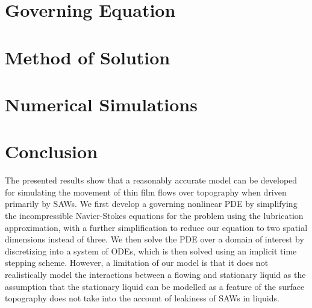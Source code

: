 \documentclass{article}
\begin{document}
\section{Governing Equation} \label{sec:gov_eq}

 
\section{Method of Solution} \label{sec:method_of_sol}


\section{Numerical Simulations} \label{sec:results}


\section{Conclusion} \label{sec:conclusion}
The presented results show that a reasonably accurate model can be developed for simulating the movement of thin 
film flows over topography when driven primarily by SAWs. We first develop a governing nonlinear PDE by simplifying the 
incompressible Navier-Stokes equations for the problem using the lubrication approximation, with a further simplification 
to reduce our equation to two spatial dimensions instead of three. We then solve the PDE over a domain of interest by discretizing 
into a system of ODEs, which is then solved using an implicit time stepping scheme. However, a limitation of our model is that 
it does not realistically model the interactions between a flowing and stationary liquid as the assumption that the stationary liquid can be 
modelled as a feature of the surface topography does not take into the account of leakiness of SAWs in liquids. 
\end{document}
